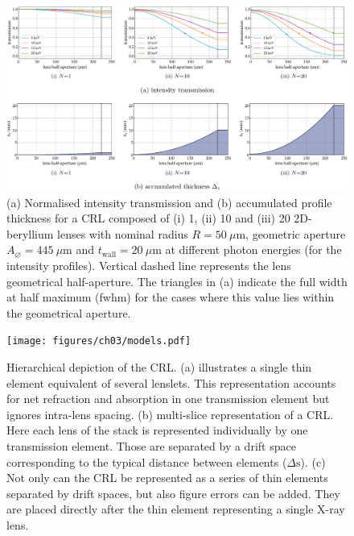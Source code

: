 \begin{refsection}
\begin{figure}[t]
    \centering
    \includegraphics[width=1\linewidth]{figures/ch03/Aeff.pdf}
    \caption[Intensity transmission and accumulated thickness profile of CRLs]{(a) Normalised intensity transmission and (b) accumulated profile thickness for a CRL composed of ($\mathrm{i}$) 1, ($\mathrm{ii}$) 10 and ($\mathrm{iii}$) 20 2D-beryllium lenses with nominal radius $R=50~\mu\text{m}$, geometric aperture $A_{\diameter}=445~\mu\text{m}$ and $t_\text{wall}=20~\mu$m at different photon energies (for the intensity profiles). Vertical dashed line represents the lens geometrical half-aperture. The triangles in (a) indicate the full width at half maximum (fwhm) for the cases where this value lies within the geometrical aperture.}
    \label{fig:EffectiveAperure}
\end{figure}

\begin{figure}[t]
    \centering
    {\texttt{[image: figures/ch03/models.pdf]}}
    \caption[Hierarchical CRL representation]{Hierarchical depiction of the CRL. (a) illustrates a single thin element equivalent of several lenslets. This representation accounts for net refraction and absorption in one transmission element but ignores intra-lens spacing. (b) multi-slice representation of a CRL. Here each lens of the stack is represented individually by one transmission element. Those are separated by a drift space corresponding to the typical distance between elements ($\Delta\text{s}$). (c) Not only can the CRL be represented as a series of thin elements separated by drift spaces, but also figure errors can be added. They are placed directly after the thin element representing a single X-ray lens.}
    \label{fig:models}
\end{figure}


\end{refsection}
